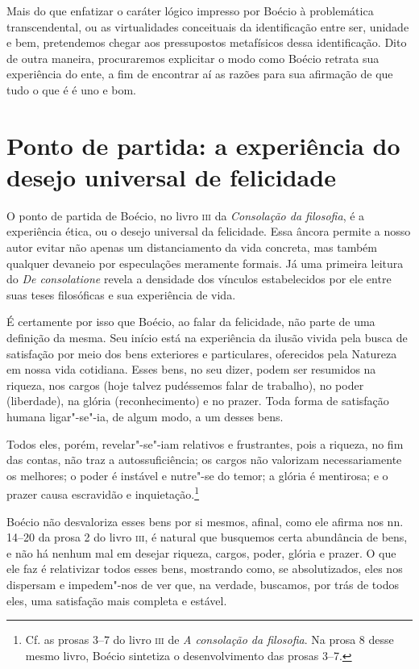 Mais do que enfatizar o caráter lógico impresso por Boécio à
problemática transcendental, ou as virtualidades conceituais da
identificação entre ser, unidade e bem, pretendemos chegar aos
pressupostos metafísicos dessa identificação. Dito de outra
maneira, procuraremos explicitar o modo como Boécio retrata sua
experiência do ente, a fim de encontrar aí as razões para sua
afirmação de que tudo o que é é uno e bom.

\section{Ponto de partida: a experiência do desejo
universal de felicidade} 

O ponto de partida de Boécio, no livro \textsc{iii} da \emph{Consolação
da filosofia}, é a experiência ética, ou o desejo
universal da felicidade. Essa âncora permite a nosso autor
evitar não apenas um distanciamento da vida concreta, mas também
qualquer devaneio por especulações meramente formais. Já uma
primeira leitura do \emph{De consolatione} revela a densidade
dos vínculos estabelecidos por ele entre suas teses filosóficas
e sua experiência de vida.

É certamente por isso que Boécio, ao falar da felicidade, não
parte de uma definição da mesma. Seu início está na experiência
da ilusão vivida pela busca de satisfação por meio dos bens
exteriores e particulares, oferecidos pela Natureza em nossa
vida cotidiana. Esses bens, no seu dizer, podem ser resumidos na
riqueza, nos cargos (hoje talvez pudéssemos falar de trabalho),
no poder (liberdade), na glória (reconhecimento) e no prazer.
Toda forma de satisfação humana ligar"-se"-ia, de algum modo, a um
desses bens.

Todos eles, porém, revelar"-se"-iam relativos e frustrantes, pois a
riqueza, no fim das contas, não traz a autossuficiência; os
cargos não valorizam necessariamente os melhores; o poder é
instável e nutre"-se do temor; a glória é mentirosa; e o prazer
causa escravidão e inquietação.\footnote{ Cf. as prosas 3--7 do
livro \textsc{iii} de \emph{A consolação da filosofia}. Na prosa 8
desse mesmo livro, Boécio sintetiza o desenvolvimento das prosas
3--7.}

Boécio não desvaloriza esses bens por si mesmos, afinal, como ele
afirma nos nn. 14--20 da prosa 2 do livro \textsc{iii}, é natural que
busquemos certa abundância de bens, e não há nenhum mal em
desejar riqueza, cargos, poder, glória e prazer. O que ele faz é
relativizar todos esses bens, mostrando como, se absolutizados,
eles nos dispersam e impedem"-nos de ver que, na verdade,
buscamos, por trás de todos eles, uma satisfação mais completa e
estável.

